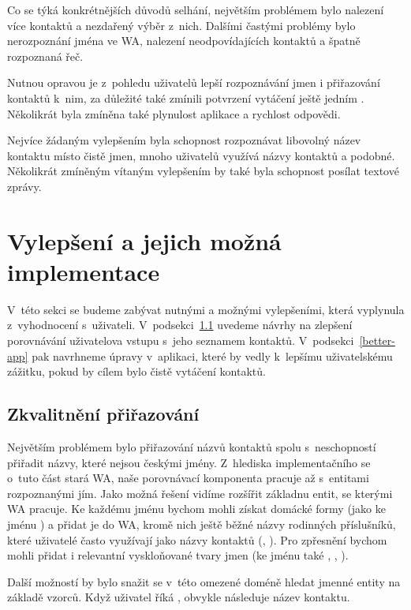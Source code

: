 Co se týká konkrétnějších důvodů selhání, největším problémem bylo nalezení více
kontaktů a nezdařený výběr z~nich. Dalšími častými problémy bylo nerozpoznání
jména ve WA, nalezení neodpovídajících kontaktů a špatně rozpoznaná řeč.

Nutnou opravou je z~pohledu uživatelů lepší rozpoznávání jmen i přiřazování
kontaktů k~nim, za důležité také zmínili potvrzení vytáčení ještě jedním
. Několikrát byla zmíněna také plynulost aplikace a rychlost
odpovědi.

Nejvíce žádaným vylepšením byla schopnost rozpoznávat libovolný název kontaktu
místo čistě jmen, mnoho uživatelů využívá názvy kontaktů  a podobné.
Několikrát zmíněným vítaným vylepšením by také byla schopnost posílat textové
zprávy.

\section{Vylepšení a jejich možná implementace}\label{improvements}

V~této sekci se budeme zabývat nutnými a možnými vylepšeními, která
vyplynula z~vyhodnocení s~uživateli. V~podsekci~\ref{better-match}
uvedeme návrhy na zlepšení porovnávání uživatelova vstupu s~jeho
seznamem kontaktů. V~podsekci~\ref{better-app} pak navrhneme
úpravy v~aplikaci, které by vedly k~lepšímu uživatelskému
zážitku, pokud by cílem bylo čistě vytáčení kontaktů.

\subsection{Zkvalitnění přiřazování}\label{better-match}

Největším problémem bylo přiřazování názvů kontaktů spolu s~neschopností přiřadit
názvy, které nejsou českými jmény. Z~hlediska implementačního se o~tuto část
stará WA, naše porovnávací komponenta pracuje až s~entitami rozpoznanými jím.
Jako možná řešení vidíme rozšířit základnu entit, se kterými WA pracuje. Ke
každému jménu bychom mohli získat domácké formy (jako  ke jménu )
a přidat je do WA, kromě nich ještě běžné názvy rodinných příslušníků,
které uživatelé často využívají jako názvy kontaktů (, ).
Pro zpřesnění bychom mohli přidat i relevantní vyskloňované tvary jmen (ke jménu 
také , , ).

Další možností by bylo snažit se v~této omezené doméně hledat jmenné entity na
základě vzorců. Když uživatel říká , obvykle následuje název
kontaktu.

